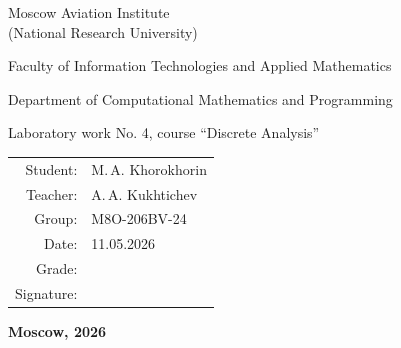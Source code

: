 \begin{titlepage}
\begin{center}
\bfseries

{\Large Moscow Aviation Institute\\ (National Research University)

}

\vspace{48pt}

{\large Faculty of Information Technologies and Applied Mathematics
}

\vspace{36pt}

{\large Department of Computational Mathematics and Programming

}


\vspace{48pt}

Laboratory work No. 4, course \enquote{Discrete Analysis}

\end{center}

\vspace{72pt}

\begin{flushright}
\begin{tabular}{rl}
Student: & M.\,A. Khorokhorin \\
Teacher: & A.\,A. Kukhtichev \\
Group: & M8O-206BV-24 \\
Date: & 11.05.2026 \\
Grade: & \\
Signature: & \\
\end{tabular}
\end{flushright}

\vfill

\begin{center}
\bfseries
Moscow, 2026
\end{center}
\end{titlepage}

\pagebreak
